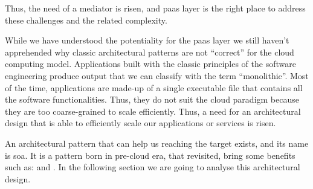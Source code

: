 Thus, the need of a mediator is risen, and \ac{paas} layer is the right place to address these challenges
and the related complexity.

While we have understood the potentiality for the \ac{paas} layer we  still haven't apprehended why
classic architectural patterns are not ``correct'' for the cloud computing model. Applications built
with the classic principles of the software engineering produce output that we can classify with the
term ``monolithic''. Most of the time, applications are made-up of a single executable file that contains
all the software functionalities. Thus, they do not suit the cloud paradigm because they are too
coarse-grained to scale efficiently. Thus, a need for an architectural design that is able to efficiently
scale our applications or services is risen.

An architectural pattern that can help us reaching the target exists, and its name is \acf{soa}. It is
a pattern born in pre-cloud era, that revisited, bring some benefits such as:  and
. In the following section we are going to analyse this architectural design.